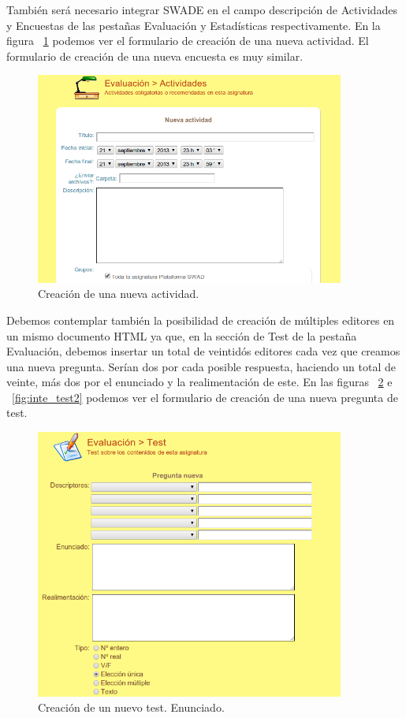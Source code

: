 También será necesario integrar SWADE en el campo descripción de Actividades y Encuestas de las pestañas Evaluación y Estadísticas respectivamente. En la figura ~\ref{fig:inte_acti} podemos ver el formulario de creación de una nueva actividad. El formulario de creación de una nueva encuesta es muy similar.

\begin{figure}[h!]
  \centering
      \includegraphics[width=4in]{fig/inte_acti}
  \caption{Creación de una nueva actividad.}
  \label{fig:inte_acti}

\end{figure}


Debemos contemplar también la posibilidad de creación de múltiples editores en un mismo documento HTML ya que, en la sección de Test de la pestaña Evaluación, debemos insertar un total de veintidós editores cada vez que creamos una nueva pregunta. Serían dos por cada posible respuesta, haciendo un total de veinte, más dos por el enunciado y la realimentación de este. En las figuras ~\ref{fig:inte_test1} e ~\ref{fig:inte_test2} podemos ver el formulario de creación de una nueva pregunta de test.

\begin{figure}[h!]
  \centering
      \includegraphics[width=4in]{fig/inte_test1}
  \caption{Creación de un nuevo test. Enunciado.}
  \label{fig:inte_test1}

\end{figure}

